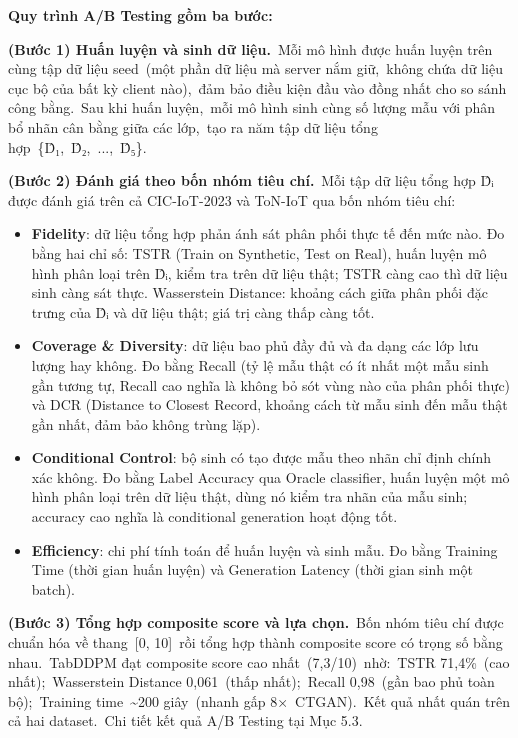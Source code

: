 \textbf{Quy trình A/B Testing gồm ba bước:}

\textbf{(Bước 1) Huấn luyện và sinh dữ liệu.}~Mỗi mô hình được huấn luyện trên cùng tập dữ liệu seed~(một phần dữ liệu mà server nắm giữ,~không chứa dữ liệu cục bộ của bất kỳ client nào),~đảm bảo điều kiện đầu vào đồng nhất cho so sánh công bằng.~Sau khi huấn luyện,~mỗi mô hình sinh cùng số lượng mẫu với phân bổ nhãn cân bằng giữa các lớp,~tạo ra năm tập dữ liệu tổng hợp~\{D̂₁,~D̂₂,~...,~D̂₅\}.

\textbf{(Bước 2) Đánh giá theo bốn nhóm tiêu chí.}~Mỗi tập dữ liệu tổng hợp D̂ᵢ được đánh giá trên cả CIC-IoT-2023 và ToN-IoT qua bốn nhóm tiêu chí:

\begin{itemize}
\item
  \textbf{Fidelity}: dữ liệu tổng hợp phản ánh sát phân phối thực tế đến mức nào. Đo bằng hai chỉ số: TSTR (Train on Synthetic, Test on Real), huấn luyện mô hình phân loại trên D̂ᵢ, kiểm tra trên dữ liệu thật; TSTR càng cao thì dữ liệu sinh càng sát thực. Wasserstein Distance: khoảng cách giữa phân phối đặc trưng của D̂ᵢ và dữ liệu thật; giá trị càng thấp càng tốt.
\item
  \textbf{Coverage \& Diversity}: dữ liệu bao phủ đầy đủ và đa dạng các lớp lưu lượng hay không. Đo bằng Recall (tỷ lệ mẫu thật có ít nhất một mẫu sinh gần tương tự, Recall cao nghĩa là không bỏ sót vùng nào của phân phối thực) và DCR (Distance to Closest Record, khoảng cách từ mẫu sinh đến mẫu thật gần nhất, đảm bảo không trùng lặp).
\item
  \textbf{Conditional Control}: bộ sinh có tạo được mẫu theo nhãn chỉ định chính xác không. Đo bằng Label Accuracy qua Oracle classifier, huấn luyện một mô hình phân loại trên dữ liệu thật, dùng nó kiểm tra nhãn của mẫu sinh; accuracy cao nghĩa là conditional generation hoạt động tốt.
\item
  \textbf{Efficiency}: chi phí tính toán để huấn luyện và sinh mẫu. Đo bằng Training Time (thời gian huấn luyện) và Generation Latency (thời gian sinh một batch).
\end{itemize}

\textbf{(Bước 3) Tổng hợp composite score và lựa chọn.}~Bốn nhóm tiêu chí được chuẩn hóa về thang~{[}0, 10{]}~rồi tổng hợp thành composite score có trọng số bằng nhau.~TabDDPM đạt composite score cao nhất~(7,3/10)~nhờ:~TSTR 71,4\%~(cao nhất);~Wasserstein Distance 0,061~(thấp nhất);~Recall 0,98~(gần bao phủ toàn bộ);~Training time~\textasciitilde200 giây~(nhanh gấp 8×~CTGAN).~Kết quả nhất quán trên cả hai dataset.~Chi tiết kết quả A/B Testing tại Mục 5.3.

